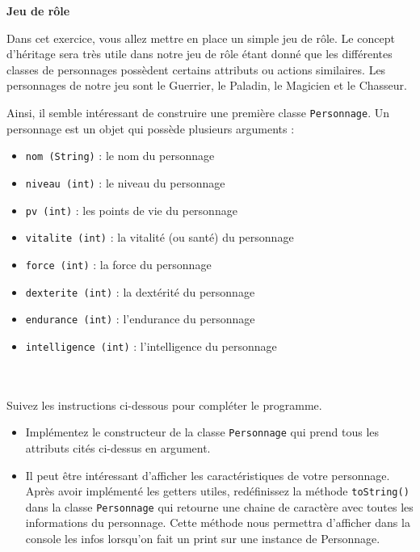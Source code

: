 \begin{Exercice}[15 minutes]\textbf{Jeu de rôle}

    
    Dans cet exercice, vous allez mettre en place un simple jeu de rôle. Le concept d’héritage sera très utile dans notre jeu de rôle étant donné que les différentes classes de personnages possèdent certains attributs ou actions similaires. Les personnages de notre jeu sont le Guerrier, le Paladin, le Magicien et le Chasseur. 
    
    Ainsi, il semble intéressant de construire une première classe \lstinline{Personnage}. Un personnage est un objet qui possède plusieurs arguments :
    \begin{itemize}
        \item \lstinline{nom (String)} : le nom du personnage
        \item \lstinline{niveau (int)} : le niveau du personnage
        \item \lstinline{pv (int)} : les points de vie du personnage
        \item \lstinline{vitalite (int)} : la vitalité (ou santé) du personnage
        \item \lstinline{force (int)} : la force du personnage
        \item \lstinline{dexterite (int)} : la dextérité du personnage
        \item \lstinline{endurance (int)} : l’endurance du personnage
        \item \lstinline{intelligence (int)} : l’intelligence du personnage\\\\\\
    \end{itemize}
    
    Suivez les instructions ci-dessous pour compléter le programme.
    
    \begin{itemize}
        \item Implémentez le constructeur de la classe \lstinline{Personnage} qui prend tous les attributs cités ci-dessus en argument. 
        
       \item Il peut être intéressant d’afficher les caractéristiques de votre personnage. Après avoir implémenté les getters utiles, redéfinissez la méthode \lstinline{toString()} dans la classe \lstinline{Personnage} qui retourne une chaine de caractère avec toutes les informations du 
       personnage. Cette méthode nous permettra d'afficher dans la console les infos lorsqu'on fait un print sur une instance de Personnage.


\end{itemize}
\end{Exercice}
